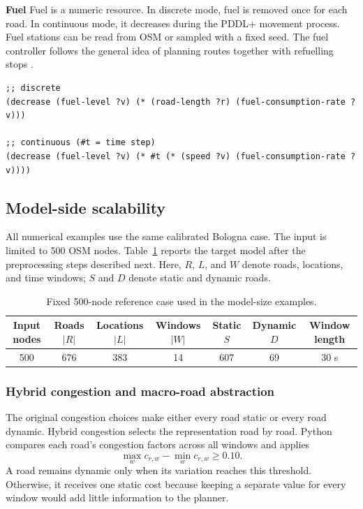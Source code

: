 \documentclass[10pt]{article}
\begin{document}
\textbf{Fuel} Fuel is a numeric resource. In discrete mode,
fuel is removed once for each road. In continuous mode, it decreases during the
PDDL+ movement process. Fuel stations can be read from OSM or sampled with a
fixed seed. The fuel
controller follows the general idea of planning routes together with refuelling
stops \cite{erdogan2012}.

\begin{lstlisting}
;; discrete 
(decrease (fuel-level ?v) (* (road-length ?r) (fuel-consumption-rate ?v)))

;; continuous (#t = time step)
(decrease (fuel-level ?v) (* #t (* (speed ?v) (fuel-consumption-rate ?v))))
\end{lstlisting}

\subsection{Model-side scalability}

All numerical examples use the same calibrated Bologna case. The input is
limited to 500 OSM nodes. Table~\ref{tab:size-reference} reports the target
model after the preprocessing steps described next. Here, $R$, $L$, and $W$
denote roads, locations, and time windows; $S$ and $D$ denote static and dynamic
roads. 

\begin{table}[H]
\centering
\caption{Fixed 500-node reference case used in the model-size examples.}
\label{tab:size-reference}
\scriptsize
\begin{tabular}{@{}ccccccc@{}}
\toprule
Input nodes & Roads $|R|$ & Locations $|L|$ & Windows $|W|$ & Static $S$ & Dynamic $D$ & Window length \\
\midrule
500 & 676 & 383 & 14 & 607 & 69 & 30 s \\
\bottomrule
\end{tabular}
\end{table}

\subsubsection{Hybrid congestion and macro-road abstraction}
The original congestion choices make either every road static or every road
dynamic. Hybrid congestion selects the representation road by road. Python
compares each road's congestion factors across all windows and applies
\[
 \max_w c_{r,w}-\min_w c_{r,w}\geq 0.10.
\]
A road remains dynamic only when its variation reaches this threshold.
Otherwise, it receives one static cost because keeping a separate value for
every window would add little information to the planner.
\end{document}
